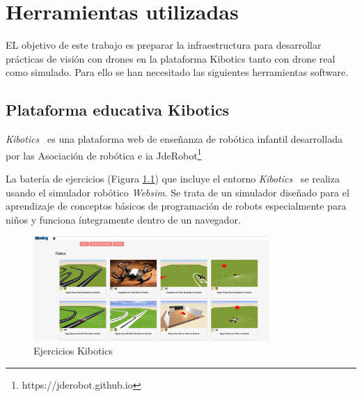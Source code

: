 \chapter{Herramientas utilizadas}\label{cap.herramientas}
EL objetivo de este trabajo es preparar la infraestructura para desarrollar prácticas de visión con drones en la plataforma Kibotics\cite{kibotics} tanto con drone real como simulado. Para ello se han necesitado las siguientes herramientas software.

\section{Plataforma educativa Kibotics}
\textit{Kibotics}~\cite{kibotics} es una plataforma web de enseñanza de robótica infantil desarrollada por las Asociación de robótica e \acrfull{ia} JdeRobot\footnote{https://jderobot.github.io}

La batería de ejercicios (Figura \ref{fig:kibotics2}) que incluye el entorno \textit{Kibotics}~\cite{kibotics} se realiza usando el simulador robótico \textit{Websim}. Se trata de un simulador diseñado para el aprendizaje de conceptos básicos de programación de robots especialmente para niños y funciona íntegramente dentro de  un navegador. 
\begin{figure}[H]
  \begin{center}
    \includegraphics[width=0.8\textwidth]{figures/herramientas/kibotics2.png}
		\caption{Ejercicios Kibotics}
		\label{fig:kibotics2}
		\end{center}
\end{figure}

